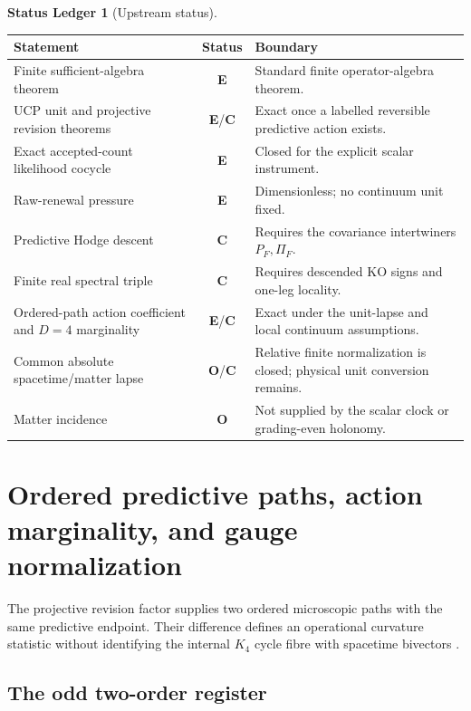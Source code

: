 \documentclass[11pt,oneside,openany]{book}
\numberwithin{equation}{chapter}
\theoremstyle{definition}
\newtheorem{ledger}[theorem]{Status Ledger}
\theoremstyle{remark}
\newcommand{\statusE}{\textcolor{ExactColor}{\textbf{E}}}
\newcommand{\statusC}{\textcolor{CondColor}{\textbf{C}}}
\newcommand{\statusO}{\textcolor{OpenColor}{\textbf{O}}}
\begin{document}
\begin{ledger}[Upstream status]
\begin{center}
\begin{tabularx}{0.96\textwidth}{@{}p{}cX@{}}
\toprule
Statement & Status & Boundary\\
\midrule
Finite sufficient-algebra theorem & \statusE & Standard finite operator-algebra theorem.\\
UCP unit and projective revision theorems & \statusE/\statusC & Exact once a labelled reversible predictive action exists.\\
Exact accepted-count likelihood cocycle & \statusE & Closed for the explicit scalar instrument.\\
Raw-renewal pressure & \statusE & Dimensionless; no continuum unit fixed.\\
Predictive Hodge descent & \statusC & Requires the covariance intertwiners $P_F,\Pi_F$.\\
Finite real spectral triple & \statusC & Requires descended KO signs and one-leg locality.\\
Ordered-path action coefficient and \(D=4\) marginality & \statusE/\statusC & Exact under the unit-lapse and local continuum assumptions.\\
Common absolute spacetime/matter lapse & \statusO/\statusC & Relative finite normalization is closed; physical unit conversion remains.\\
Matter incidence & \statusO & Not supplied by the scalar clock or grading-even holonomy.\\
\bottomrule
\end{tabularx}
\end{center}
\end{ledger}


\chapter{Ordered predictive paths, action marginality, and gauge normalization}
\label{ch:ordered-action}

The projective revision factor supplies two ordered microscopic paths with
the same predictive endpoint.  Their difference defines an operational
curvature statistic without identifying the internal \(K_4\) cycle fibre
with spacetime bivectors \cite{PelissierProtectedK4}.

\section{The odd two-order register}
\end{document}
